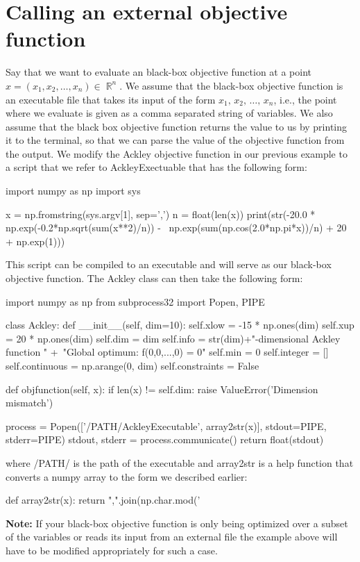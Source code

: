\documentclass[]{article}
\DeclareMathOperator{\Rb}{\mathbb{R}}
\begin{document}
\section{Calling an external objective function}
Say that we want to evaluate an black-box objective function at a point \\ $x=(x_1,x_2,\ldots,x_n) \in \Rb^n$. We assume that the black-box objective function is an executable file that takes its input of the form \textquotesingle $x_1, \,x_2, \, \ldots, \, x_n$\textquotesingle, i.e., the point where we evaluate is given as a comma separated string of variables. We also assume that the black box objective function returns the value to us by printing it to the terminal, so that we can parse the value of the objective function from the output. We modify the Ackley objective function in our previous example to a script that we refer to AckleyExectuable that has the following form:
\begin{python}
import numpy as np
import sys

x = np.fromstring(sys.argv[1], sep=',')
n = float(len(x))
print(str(-20.0 * np.exp(-0.2*np.sqrt(sum(x**2)/n)) - \
np.exp(sum(np.cos(2.0*np.pi*x))/n) + 20 + np.exp(1)))
\end{python}
This script can be compiled to an executable and will serve as our black-box objective function. The Ackley class can then take the following form:
\begin{python}
import numpy as np
from subprocess32 import Popen, PIPE

class Ackley:
    def __init__(self, dim=10):
        self.xlow = -15 * np.ones(dim)
        self.xup = 20 * np.ones(dim)
        self.dim = dim
        self.info = str(dim)+"-dimensional Ackley function \n" +\
                             "Global optimum: f(0,0,...,0) = 0"
        self.min = 0
        self.integer = []
        self.continuous = np.arange(0, dim)
        self.constraints = False

    def objfunction(self, x):
        if len(x) != self.dim:
            raise ValueError('Dimension mismatch')

        process = Popen(['/PATH/AckleyExecutable', array2str(x)], 
        		stdout=PIPE, stderr=PIPE)
        stdout, stderr = process.communicate()
        return float(stdout)
\end{python}
where /PATH/ is the path of the executable and array2str is a help function that converts a numpy array to the form we described earlier:
\begin{python}
def array2str(x):
    return ",".join(np.char.mod('%
\end{python}
\textbf{Note:} If your black-box objective function is only being optimized over a subset of the variables or reads its input from an external file the example above will have to be modified appropriately for such a case.
\end{document}
